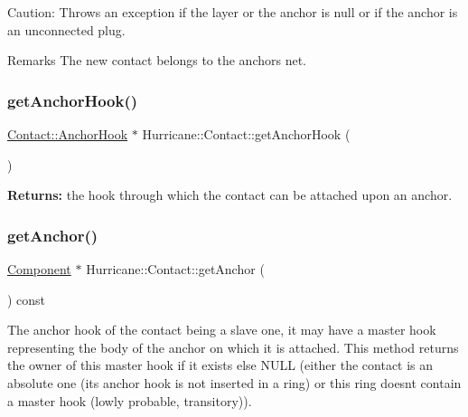 \begin{DoxyParagraph}{Caution\+: Throws an exception if the layer or the anchor is null or if }
the anchor is an unconnected plug.
\end{DoxyParagraph}
\begin{DoxyRemark}{Remarks}
The new contact belongs to the anchor\textquotesingle{}s net. 
\end{DoxyRemark}
\mbox{\label{classHurricane_1_1Contact_a300306b006397377bc9a54ea783c1150}} 
\subsubsection{\texorpdfstring{get\+Anchor\+Hook()}{getAnchorHook()}}
{\footnotesize\ttfamily \mbox{\hyperlink{classHurricane_1_1Contact_1_1AnchorHook}{Contact\+::\+Anchor\+Hook}} $\ast$ Hurricane\+::\+Contact\+::get\+Anchor\+Hook (\begin{DoxyParamCaption}{ }\end{DoxyParamCaption})\hspace{0.3cm}{\ttfamily [inline]}}

{\bfseries Returns\+:} the hook through which the contact can be attached upon an anchor. \mbox{\label{classHurricane_1_1Contact_ab0b327b306bf7ebda634f59d8d0cfd8f}} 
\subsubsection{\texorpdfstring{get\+Anchor()}{getAnchor()}}
{\footnotesize\ttfamily \mbox{\hyperlink{classHurricane_1_1Component}{Component}} $\ast$ Hurricane\+::\+Contact\+::get\+Anchor (\begin{DoxyParamCaption}{ }\end{DoxyParamCaption}) const}

The anchor hook of the contact being a slave one, it may have a master hook representing the body of the anchor on which it is attached. This method returns the owner of this master hook if it exists else N\+U\+LL (either the contact is an absolute one (its anchor hook is not inserted in a ring) or this ring doesn\textquotesingle{}t contain a master hook (lowly probable, transitory)). \mbox{\label{classHurricane_1_1Contact_acf8405f74b97239ea74ec629d0b4e194}} 
